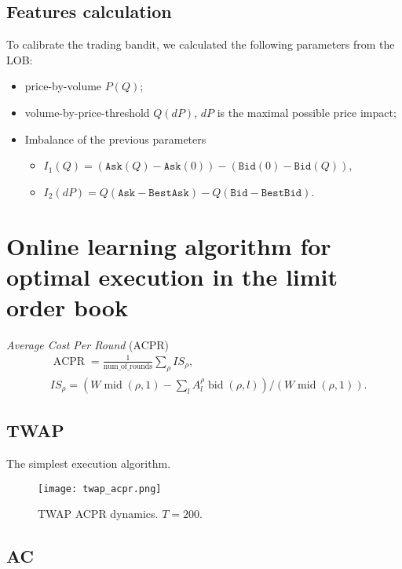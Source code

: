     \subsection{Features calculation}
        To calibrate the trading bandit, we calculated the following parameters from the LOB:
        \begin{itemize}
            \item price-by-volume $P(Q)$;
            \item volume-by-price-threshold $Q(dP)$, $dP$ is the maximal possible price impact;
            \item Imbalance of the previous parameters\begin{itemize}
                \item $I_1(Q) = (\texttt{Ask}(Q) - \texttt{Ask}(0)) - (\texttt{Bid}(0) - \texttt{Bid}(Q))$,
                \item $I_2(dP) = Q(\texttt{Ask} - \texttt{BestAsk}) - Q(\texttt{Bid} - \texttt{BestBid})$.
            \end{itemize}
        \end{itemize}

\section{Online learning algorithm for optimal execution in the limit order book}
    \begin{definition}
        \emph{Average Cost Per Round} (ACPR)
        \begin{align}
            & \operatorname*{ACPR} = \frac{1}{\operatorname{num\_of\_rounds}} \sum_\rho IS_\rho,\\
            & IS_\rho = (W \operatorname{mid}(\rho, 1) - \sum_l A^\rho_l \operatorname{bid}(\rho, l))/(W\operatorname{mid}(\rho, 1)).
        \end{align}
    \end{definition}
    \subsection{TWAP}
        The simplest execution algorithm.
        \begin{figure}
            \texttt{[image: twap\_acpr.png]}
            \caption{TWAP ACPR dynamics. $T = 200$.}
        \end{figure}

    \subsection{AC}

